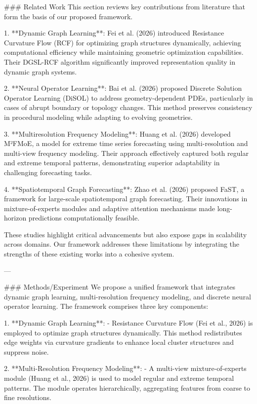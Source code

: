 ### Related Work
This section reviews key contributions from literature that form the basis of our proposed framework.

1. **Dynamic Graph Learning**: Fei et al. (2026) introduced Resistance Curvature Flow (RCF) for optimizing graph structures dynamically, achieving computational efficiency while maintaining geometric optimization capabilities. Their DGSL-RCF algorithm significantly improved representation quality in dynamic graph systems.

2. **Neural Operator Learning**: Bai et al. (2026) proposed Discrete Solution Operator Learning (DiSOL) to address geometry-dependent PDEs, particularly in cases of abrupt boundary or topology changes. This method preserves consistency in procedural modeling while adapting to evolving geometries.

3. **Multiresolution Frequency Modeling**: Huang et al. (2026) developed M²FMoE, a model for extreme time series forecasting using multi-resolution and multi-view frequency modeling. Their approach effectively captured both regular and extreme temporal patterns, demonstrating superior adaptability in challenging forecasting tasks.

4. **Spatiotemporal Graph Forecasting**: Zhao et al. (2026) proposed FaST, a framework for large-scale spatiotemporal graph forecasting. Their innovations in mixture-of-experts modules and adaptive attention mechanisms made long-horizon predictions computationally feasible.

These studies highlight critical advancements but also expose gaps in scalability across domains. Our framework addresses these limitations by integrating the strengths of these existing works into a cohesive system.

---

### Methods/Experiment
We propose a unified framework that integrates dynamic graph learning, multi-resolution frequency modeling, and discrete neural operator learning. The framework comprises three key components:

1. **Dynamic Graph Learning**:
   - Resistance Curvature Flow (Fei et al., 2026) is employed to optimize graph structures dynamically. This method redistributes edge weights via curvature gradients to enhance local cluster structures and suppress noise.

2. **Multi-Resolution Frequency Modeling**:
   - A multi-view mixture-of-experts module (Huang et al., 2026) is used to model regular and extreme temporal patterns. The module operates hierarchically, aggregating features from coarse to fine resolutions.

